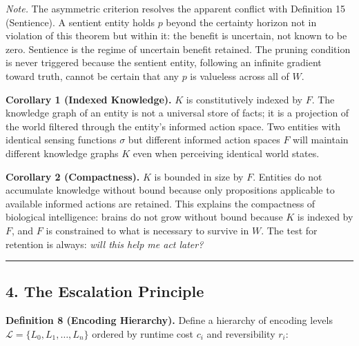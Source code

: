 \documentclass[
]{article}
\begin{document}
\emph{Note.} The asymmetric criterion resolves the apparent conflict
with Definition 15 (Sentience). A sentient entity holds \(p\) beyond the
certainty horizon not in violation of this theorem but within it: the
benefit is uncertain, not known to be zero. Sentience is the regime of
uncertain benefit retained. The pruning condition is never triggered
because the sentient entity, following an infinite gradient toward
truth, cannot be certain that any \(p\) is valueless across all of
\(W\).

\textbf{Corollary 1 (Indexed Knowledge).} \(K\) is constitutively
indexed by \(F\). The knowledge graph of an entity is not a universal
store of facts; it is a projection of the world filtered through the
entity's informed action space. Two entities with identical sensing
functions \(\sigma\) but different informed action spaces \(F\) will
maintain different knowledge graphs \(K\) even when perceiving identical
world states.

\textbf{Corollary 2 (Compactness).} \(K\) is bounded in size by \(F\).
Entities do not accumulate knowledge without bound because only
propositions applicable to available informed actions are retained. This
explains the compactness of biological intelligence: brains do not grow
without bound because \(K\) is indexed by \(F\), and \(F\) is
constrained to what is necessary to survive in \(W\). The test for
retention is always: \emph{will this help me act later?}

\begin{center}\rule{0.5\linewidth}{0.5pt}\end{center}

\subsection{4. The Escalation Principle}\label{the-escalation-principle}

\textbf{Definition 8 (Encoding Hierarchy).} Define a hierarchy of
encoding levels \(\mathcal{L} = \{L_0, L_1, \ldots, L_n\}\) ordered by
runtime cost \(c_i\) and reversibility \(r_i\):
\end{document}
